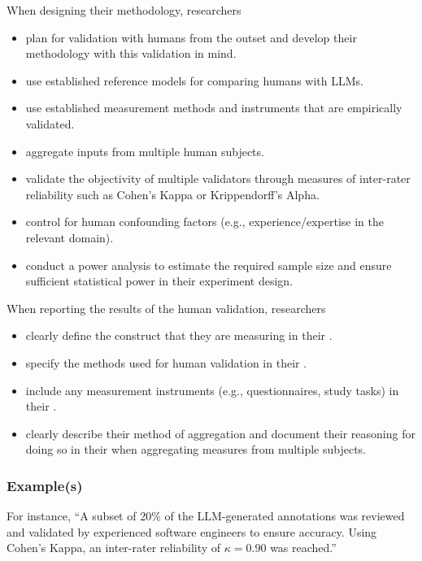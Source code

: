 When designing their methodology, researchers
\begin{itemize}
    \item \should plan for validation with humans from the outset and develop their methodology with this validation in mind.
    \item \should use established reference models for comparing humans with LLMs.
    \item \should use established measurement methods and instruments that are empirically validated.
    \item \may aggregate inputs from multiple human subjects.
    \item \should validate the objectivity of multiple validators through measures of inter-rater reliability such as Cohen's Kappa or Krippendorff's Alpha.
    \item \should control for human confounding factors (e.g., experience/expertise in the relevant domain). 
    \item \should conduct a power analysis to estimate the required sample size and ensure sufficient statistical power in their experiment design.
\end{itemize}

When reporting the results of the human validation, researchers
\begin{itemize}
    \item \must clearly define the construct that they are measuring in their \paper.
    \item \must specify the methods used for human validation in their \paper.
    \item \should include any measurement instruments (e.g., questionnaires, study tasks) in their \supplementarymaterial.
    \item \should clearly describe their method of aggregation and document their reasoning for doing so in their \paper when aggregating measures from multiple subjects.
\end{itemize}

\subsubsection{Example(s)}

For instance, ``A subset of 20\% of the LLM-generated annotations was reviewed and validated by experienced software engineers to ensure accuracy. Using Cohen's Kappa, an inter-rater reliability of $\kappa = 0.90$ was reached.'' 

